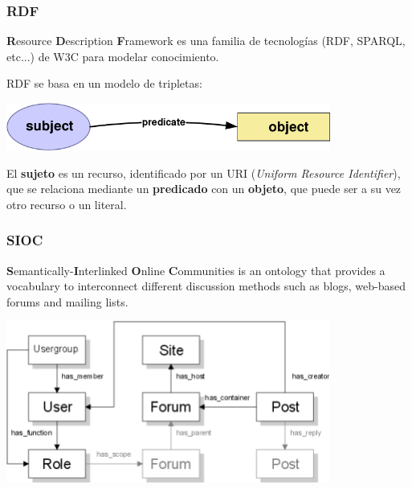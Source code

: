 \documentclass[spanish,notes=hide]{beamer}
\begin{document}
{
  \frametitle{RDF}

  \begin{Large}
     \textbf{R}esource \textbf{D}escription \textbf{F}ramework es una familia de
     tecnologías (RDF, SPARQL, etc...) de W3C para modelar conocimiento. 
  \end{Large}

  \vspace{0.7cm}

  \begin{Large}
     RDF se basa en un modelo de tripletas:
     \begin{center}
       \includegraphics[width=0.8\textwidth]{images/triple.png}
     \end{center}
     El \textbf{sujeto} es un recurso, identificado por un URI 
     (\textit{Uniform Resource Identifier}), que se relaciona mediante un 
     \textbf{predicado} con un \textbf{objeto}, que puede ser a su vez otro 
     recurso o un literal.
  \end{Large}
}
\frame
{
  \frametitle{SIOC}

  \begin{Large}
    \textbf{S}emantically-\textbf{I}nterlinked \textbf{O}nline \textbf{C}ommunities 
    is an ontology that provides a vocabulary to interconnect different discussion 
    methods such as blogs, web-based forums and mailing lists.
  \end{Large}

  \begin{center}
    \includegraphics[width=0.8\textwidth]{images/sioc-terms.png}
  \end{center}


}
\end{document}

